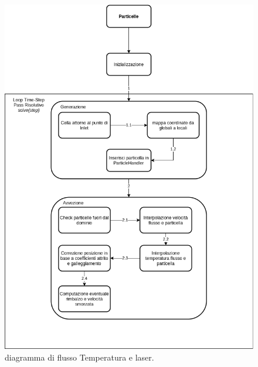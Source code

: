     \begin{figure}[H]
        \centering
        \includegraphics[width=\linewidth]{diagrammi/diagrammiParticelle.png}
        \caption{diagramma di flusso Temperatura e laser.}
    \end{figure}
    
